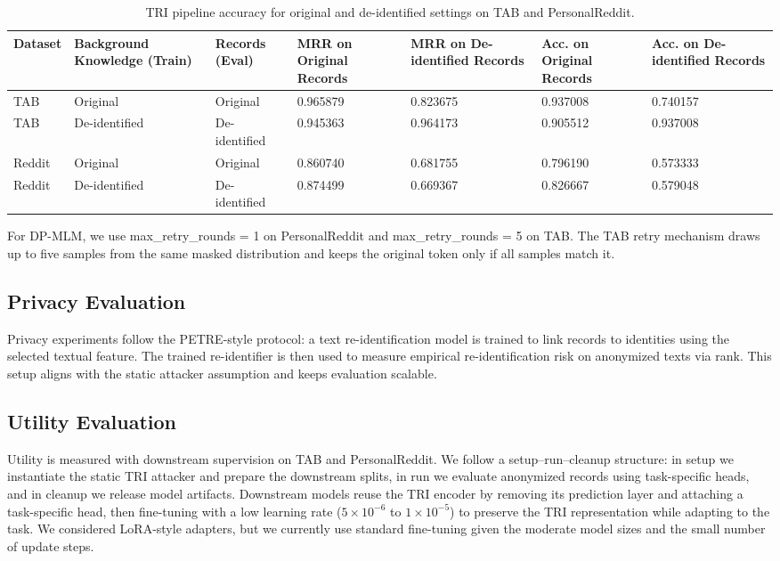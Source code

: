 \documentclass[10pt, a4paper]{article}
\begin{document}
\begin{table}[!htp]
\centering
\small
\setlength{\tabcolsep}{4pt}
\begin{tabularx}{\columnwidth}{|l|X|X|l|l|l|l|}
\hline
\textbf{Dataset} & \textbf{Background Knowledge (Train)} &  \textbf{Records (Eval)} & \textbf{MRR on Original Records} & \textbf{MRR on De-identified Records} & \textbf{Acc. on Original Records} & \textbf{Acc. on De-identified Records} \\
\hline
TAB & Original & Original & 0.965879 & 0.823675 & 0.937008 & 0.740157 \\
TAB & De-identified & De-identified & 0.945363 & 0.964173 & 0.905512 & 0.937008 \\
Reddit & Original & Original & 0.860740 & 0.681755 & 0.796190 & 0.573333 \\
Reddit & De-identified & De-identified & 0.874499 & 0.669367 & 0.826667 & 0.579048 \\
\hline
\end{tabularx}
\caption{TRI pipeline accuracy for original and de-identified settings on TAB and PersonalReddit.}
\end{table}

For DP-MLM, we use max\_retry\_rounds = 1 on PersonalReddit and max\_retry\_rounds = 5 on TAB. The TAB retry mechanism draws up to five samples from the same masked distribution and keeps the original token only if all samples match it.

\subsection{Privacy Evaluation}

Privacy experiments follow the PETRE-style protocol: a text re-identification model is trained to link records to identities using the selected textual feature. The trained re-identifier is then used to measure empirical re-identification risk on anonymized texts via rank. This setup aligns with the static attacker assumption and keeps evaluation scalable.

\subsection{Utility Evaluation}

Utility is measured with downstream supervision on TAB and PersonalReddit. We follow a setup--run--cleanup structure: in setup we instantiate the static TRI attacker and prepare the downstream splits, in run we evaluate anonymized records using task-specific heads, and in cleanup we release model artifacts. Downstream models reuse the TRI encoder by removing its prediction layer and attaching a task-specific head, then fine-tuning with a low learning rate ($5\times10^{-6}$ to $1\times10^{-5}$) to preserve the TRI representation while adapting to the task. We considered LoRA-style adapters, but we currently use standard fine-tuning given the moderate model sizes and the small number of update steps.
\end{document}
